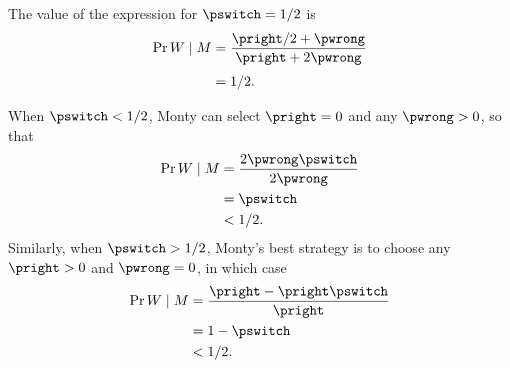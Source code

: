 The value of the expression for $\pswitch=1/2$ is
\begin{align*}
    \Pr{W\mid M} &= \frac{\pright/2+\pwrong}{\pright+2\pwrong} \\[1mm]
    &= 1/2.
\end{align*}

When $\pswitch<1/2$, Monty can select $\pright=0$ and any $\pwrong>0$, so that
\begin{align*}
    \Pr{W\mid M} &= \frac{2\pwrong\pswitch}{2\pwrong} \\
    &= \pswitch \\
    &< 1/2.
\end{align*}
Similarly, when $\pswitch>1/2$, Monty's best strategy is to choose any $\pright>0$ and $\pwrong=0$, in which case
\begin{align*}
    \Pr{W\mid M} &= \frac{\pright-\pright\pswitch}{\pright} \\
    &= 1-\pswitch \\
    &< 1/2.
\end{align*}
